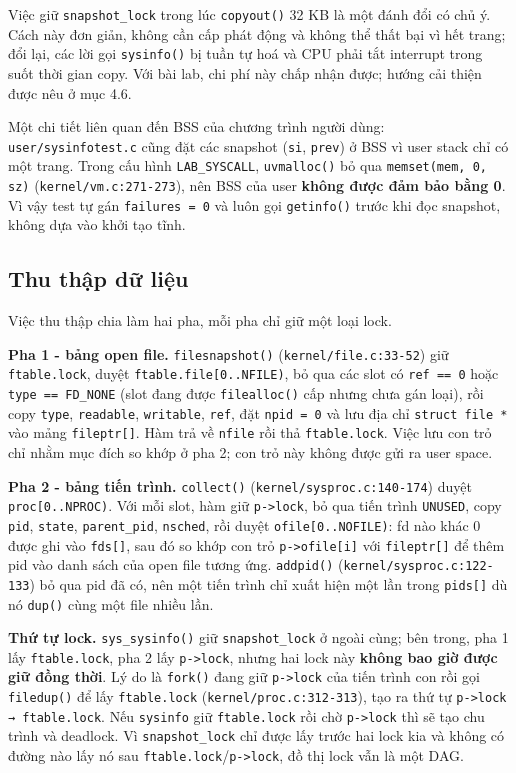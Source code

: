 Việc giữ \texttt{snapshot\_lock} trong lúc \texttt{copyout()} 32 KB là một đánh đổi có chủ ý. Cách này đơn giản, không cần cấp phát động và không thể thất bại vì hết trang; đổi lại, các lời gọi \texttt{sysinfo()} bị tuần tự hoá và CPU phải tắt interrupt trong suốt thời gian copy. Với bài lab, chi phí này chấp nhận được; hướng cải thiện được nêu ở mục 4.6.

Một chi tiết liên quan đến BSS của chương trình người dùng: \texttt{user/sysinfotest.c} cũng đặt các snapshot (\texttt{si}, \texttt{prev}) ở BSS vì user stack chỉ có một trang. Trong cấu hình \texttt{LAB\_SYSCALL}, \texttt{uvmalloc()} bỏ qua \texttt{memset(mem, 0, sz)} (\texttt{kernel/vm.c:271-273}), nên BSS của user \textbf{không được đảm bảo bằng 0}. Vì vậy test tự gán \texttt{failures = 0} và luôn gọi \texttt{getinfo()} trước khi đọc snapshot, không dựa vào khởi tạo tĩnh.

\subsection{Thu thập dữ liệu}

Việc thu thập chia làm hai pha, mỗi pha chỉ giữ một loại lock.

\textbf{Pha 1 - bảng open file.} \texttt{filesnapshot()} (\texttt{kernel/file.c:33-52}) giữ \texttt{ftable.lock}, duyệt \texttt{ftable.file[0..NFILE)}, bỏ qua các slot có \texttt{ref == 0} hoặc \texttt{type == FD\_NONE} (slot đang được \texttt{filealloc()} cấp nhưng chưa gán loại), rồi copy \texttt{type}, \texttt{readable}, \texttt{writable}, \texttt{ref}, đặt \texttt{npid = 0} và lưu địa chỉ \texttt{struct file *} vào mảng \texttt{fileptr[]}. Hàm trả về \texttt{nfile} rồi thả \texttt{ftable.lock}. Việc lưu con trỏ chỉ nhằm mục đích so khớp ở pha 2; con trỏ này không được gửi ra user space.

\textbf{Pha 2 - bảng tiến trình.} \texttt{collect()} (\texttt{kernel/sysproc.c:140-174}) duyệt \texttt{proc[0..NPROC)}. Với mỗi slot, hàm giữ \texttt{p->lock}, bỏ qua tiến trình \texttt{UNUSED}, copy \texttt{pid}, \texttt{state}, \texttt{parent\_pid}, \texttt{nsched}, rồi duyệt \texttt{ofile[0..NOFILE)}: fd nào khác 0 được ghi vào \texttt{fds[]}, sau đó so khớp con trỏ \texttt{p->ofile[i]} với \texttt{fileptr[]} để thêm pid vào danh sách của open file tương ứng. \texttt{addpid()} (\texttt{kernel/sysproc.c:122-133}) bỏ qua pid đã có, nên một tiến trình chỉ xuất hiện một lần trong \texttt{pids[]} dù nó \texttt{dup()} cùng một file nhiều lần.

\textbf{Thứ tự lock.} \texttt{sys\_sysinfo()} giữ \texttt{snapshot\_lock} ở ngoài cùng; bên trong, pha 1 lấy \texttt{ftable.lock}, pha 2 lấy \texttt{p->lock}, nhưng hai lock này \textbf{không bao giờ được giữ đồng thời}. Lý do là \texttt{fork()} đang giữ \texttt{p->lock} của tiến trình con rồi gọi \texttt{filedup()} để lấy \texttt{ftable.lock} (\texttt{kernel/proc.c:312-313}), tạo ra thứ tự \texttt{p->lock → ftable.lock}. Nếu \texttt{sysinfo} giữ \texttt{ftable.lock} rồi chờ \texttt{p->lock} thì sẽ tạo chu trình và deadlock. Vì \texttt{snapshot\_lock} chỉ được lấy trước hai lock kia và không có đường nào lấy nó sau \texttt{ftable.lock}/\texttt{p->lock}, đồ thị lock vẫn là một DAG.

